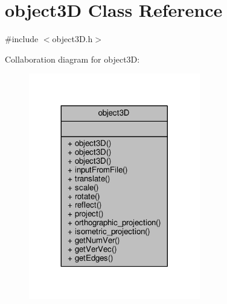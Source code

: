 \hypertarget{classobject3D}{}\section{object3D Class Reference}
\label{classobject3D}


{\ttfamily \#include $<$object3\+D.\+h$>$}



Collaboration diagram for object3D\+:
\nopagebreak
\begin{figure}[H]
\begin{center}
\leavevmode
\includegraphics[width=212pt]{classobject3D__coll__graph}
\end{center}
\end{figure}
